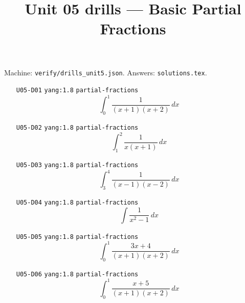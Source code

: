 
\title{Unit 05 drills --- Basic Partial Fractions}
\author{}
\date{}

\maketitle
\noindent Machine: \texttt{verify/drills\_unit5.json}. Answers: \texttt{solutions.tex}.
\begin{enumerate}
\item[\texttt{U05-D01}] \texttt{yang:1.8} \texttt{partial-fractions}
\[ \int_0^1 \frac{1}{(x+1)(x+2)}\,dx \]
\item[\texttt{U05-D02}] \texttt{yang:1.8} \texttt{partial-fractions}
\[ \int_1^2 \frac{1}{x(x+1)}\,dx \]
\item[\texttt{U05-D03}] \texttt{yang:1.8} \texttt{partial-fractions}
\[ \int_3^4 \frac{1}{(x-1)(x-2)}\,dx \]
\item[\texttt{U05-D04}] \texttt{yang:1.8} \texttt{partial-fractions}
\[ \int \frac{1}{x^2-1}\,dx \]
\item[\texttt{U05-D05}] \texttt{yang:1.8} \texttt{partial-fractions}
\[ \int_0^1 \frac{3x+4}{(x+1)(x+2)}\,dx \]
\item[\texttt{U05-D06}] \texttt{yang:1.8} \texttt{partial-fractions}
\[ \int_0^1 \frac{x+5}{(x+1)(x+2)}\,dx \]
\end{enumerate}

